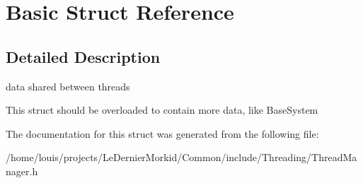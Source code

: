 \hypertarget{struct_basic}{}\section{Basic Struct Reference}
\label{struct_basic}


\subsection{Detailed Description}
data shared between threads

This struct should be overloaded to contain more data, like Base\+System 

The documentation for this struct was generated from the following file\+:\begin{DoxyCompactItemize}
\item 
/home/louis/projects/\+Le\+Dernier\+Morkid/\+Common/include/\+Threading/Thread\+Manager.\+h\end{DoxyCompactItemize}
